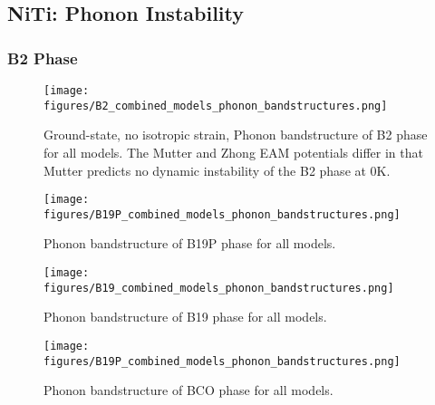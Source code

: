 \documentclass[preprint]{elsarticle}
\begin{document}
\subsection{NiTi: Phonon Instability}
\label{subsec:niphonons}


\subsubsection{B2 Phase}
\label{subsubsec:b2}

\begin{figure}[ht!]
    \begin{centering}
        \texttt{[image: figures/B2\_combined\_models\_phonon\_bandstructures.png]}
        \caption{
          Ground-state, no isotropic strain, Phonon bandstructure of B2 phase for all models. The Mutter and Zhong EAM potentials differ in that Mutter predicts no dynamic instability of the B2 phase at 0K. 
        }
        \label{fig:allmodels_no_strainphonon_b2}
    \end{centering}
\end{figure}

\begin{figure}[ht!]
    \begin{centering}
        \texttt{[image: figures/B19P\_combined\_models\_phonon\_bandstructures.png]}
        \caption{
          Phonon bandstructure of B19P phase for all models.
        }
        \label{fig:allmodels_no_strainphonon_B19P}
    \end{centering}
\end{figure}

\begin{figure}[ht!]
    \begin{centering}
        \texttt{[image: figures/B19\_combined\_models\_phonon\_bandstructures.png]}
        \caption{
          Phonon bandstructure of B19 phase for all models.
        }
        \label{fig:allmodels_no_strainphonon_B19P}
    \end{centering}
\end{figure}


\begin{figure}[ht!]
    \begin{centering}
        \texttt{[image: figures/B19P\_combined\_models\_phonon\_bandstructures.png]}
        \caption{
          Phonon bandstructure of BCO phase for all models.
        }
        \label{fig:allmodels_no_strainphonon_B19P}
    \end{centering}
\end{figure}
\end{document}
